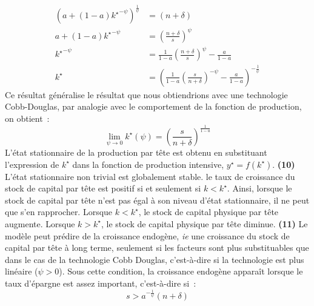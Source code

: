 \documentclass[11pt,a4paper,notitlepage]{article}
\begin{document}
\[
  \begin{split}
    \left(a + (1-a)\left.k^{\star}\right.^{-\psi}\right)^{\frac{1}{\psi}} &= (n+\delta)\\
    a + (1-a)\left.k^{\star}\right.^{-\psi} &= \left(\frac{n+\delta}{s}\right)^\psi\\
    \left.k^{\star}\right.^{-\psi} &= \frac{1}{1-a}\left(\frac{n+\delta}{s}\right)^\psi - \frac{a}{1-a}\\
    k^{\star} &= \left(\frac{1}{1-a}\left(\frac{s}{n+\delta}\right)^{-\psi} - \frac{a}{1-a}\right)^{-\frac{1}{\psi}} 
  \end{split}
\]
Ce résultat généralise le résultat que nous obtiendrions avec une technologie Cobb-Douglas, par analogie avec le comportement de la fonction de production, on obtient :
\[
\lim_{\psi\rightarrow 0} k^{\star}(\psi) = \left(\frac{s}{n+\delta}\right)^{\frac{1}{1-a}}
\]
L'état stationnaire de la production par tête est obtenu en substituant l'expression de $k^{\star}$ dans la fonction de production intensive, $y^{\star} = f(k^{\star})$. \textbf{(10)} L'état stationnaire non trivial est globalement stable. le taux de croissance du stock de capital par tête est positif si et seulement si $k<k^{\star}$. Ainsi, lorsque le stock de capital par tête n'est pas égal à son niveau d'état stationnaire, il ne peut que s'en rapprocher. Lorsque $k<k^{\star}$, le stock de capital physique par tête augmente. Lorsque $k>k^{\star}$, le stock de capital physique par tête diminue. \textbf{(11)} Le modèle peut prédire de la croissance endogène, \emph{ie} une croissance du stock de capital par tête à long terme, seulement si les facteurs sont plus substituables que dans le cas de la technologie Cobb Douglas, c'est-à-dire si la technologie est plus linéaire ($\psi>0$). Sous cette condition, la croissance endogène apparaît lorsque le taux d'épargne est assez important, c'est-à-dire si :
\[
  s >  a^{-\frac{1}{\psi}}(n+\delta)
\]

\newpage
\end{document}
